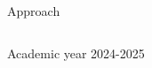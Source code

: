 \documentclass[final]{beamer}
\newlength{\sepwid}
\newlength{\onecolwid}
\begin{document}
\begin{frame}[t,fragile]
\begin{columns}[t]
\begin{column}{\onecolwid}
\begin{block}{Approach}
  \end{block}
\end{column}


\begin{column}{\sepwid}\end{column} %


\end{columns} %
\vspace{-1in}
\begin{center}

  Academic year 2024-2025
\end{center}

\end{frame}
\end{document}
